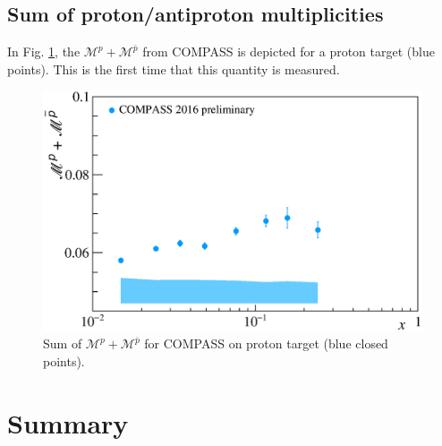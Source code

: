 \subsection{Sum of proton/antiproton multiplicities}

In Fig. \ref{pic:psum}, the $\mathscr{M}^{p}+\mathscr{M}^{\bar{p}}$ from COMPASS is depicted for a proton target (blue points). This is the first time that this quantity is measured.

\begin{figure}[!h]
  \centering
	\includegraphics[scale=0.5]{./gfx/Mult_p_sum.eps}
	\caption{Sum of $\mathscr{M}^{p}+\mathscr{M}^{\overline{p}}$ for COMPASS on proton target (blue closed points).}
	\label{pic:psum}
\end{figure}

\newpage

\section{Summary}

